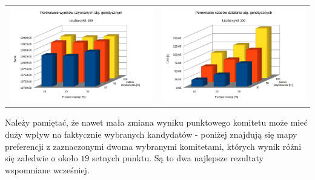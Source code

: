 \documentclass[pdflatex,11pt]{../aghdoc_version2}
\begin{document}
\begin{tabular}{cc}
\includegraphics[width=0.4\paperwidth]{pics/porownanie1/wynik100.png} & 
\includegraphics[width=0.4\paperwidth]{pics/porownanie1/czas100.png} \\
		
\end{tabular}

\newpage

Należy pamiętać, że nawet mała zmiana wyniku punktowego komitetu może mieć duży wpływ na faktycznie wybranych kandydatów - poniżej znajdują się mapy preferencji z zaznaczonymi dwoma wybranymi komitetami, których wynik różni się zaledwie o około $19$ setnych punktu. Są to dwa najlepsze rezultaty wspomniane wcześniej.
\end{document}
